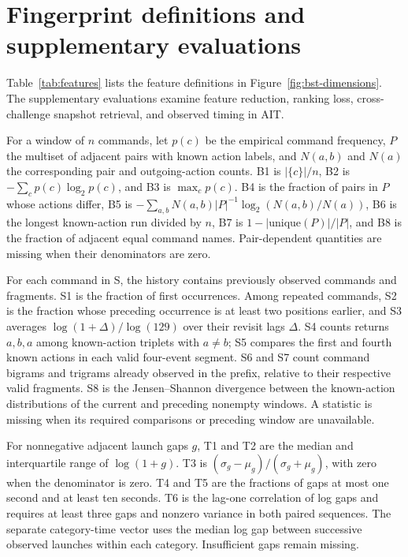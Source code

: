 \documentclass[10pt]{article}
\begin{document}
\FloatBarrier
\section{Fingerprint definitions and supplementary evaluations}\label{app:overnight-figures}
Table~\ref{tab:features} lists the feature definitions in Figure~\ref{fig:bst-dimensions}. The supplementary evaluations examine feature reduction, ranking loss, cross-challenge snapshot retrieval, and observed timing in AIT.

For a window of $n$ commands, let $p(c)$ be the empirical command frequency, $P$ the multiset of adjacent pairs with known action labels, and $N(a,b)$ and $N(a)$ the corresponding pair and outgoing-action counts. B1 is $|\{c\}|/n$, B2 is $-\sum_c p(c)\log_2 p(c)$, and B3 is $\max_c p(c)$. B4 is the fraction of pairs in $P$ whose actions differ, B5 is $-\sum_{a,b}N(a,b)|P|^{-1}\log_2(N(a,b)/N(a))$, B6 is the longest known-action run divided by $n$, B7 is $1-|\mathrm{unique}(P)|/|P|$, and B8 is the fraction of adjacent equal command names. Pair-dependent quantities are missing when their denominators are zero.

For each command in S, the history contains previously observed commands and fragments. S1 is the fraction of first occurrences. Among repeated commands, S2 is the fraction whose preceding occurrence is at least two positions earlier, and S3 averages $\log(1+\Delta)/\log(129)$ over their revisit lags $\Delta$. S4 counts returns $a,b,a$ among known-action triplets with $a\ne b$; S5 compares the first and fourth known actions in each valid four-event segment. S6 and S7 count command bigrams and trigrams already observed in the prefix, relative to their respective valid fragments. S8 is the Jensen--Shannon divergence between the known-action distributions of the current and preceding nonempty windows. A statistic is missing when its required comparisons or preceding window are unavailable.

For nonnegative adjacent launch gaps $g$, T1 and T2 are the median and interquartile range of $\log(1+g)$. T3 is $(\sigma_g-\mu_g)/(\sigma_g+\mu_g)$, with zero when the denominator is zero. T4 and T5 are the fractions of gaps at most one second and at least ten seconds. T6 is the lag-one correlation of log gaps and requires at least three gaps and nonzero variance in both paired sequences. The separate category-time vector uses the median log gap between successive observed launches within each category. Insufficient gaps remain missing.
\end{document}
